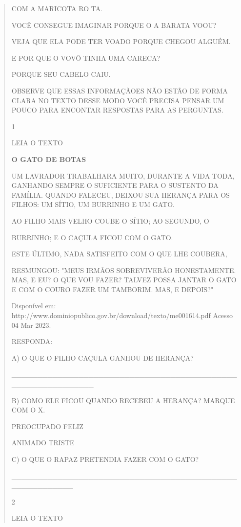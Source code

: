\begin{verse}
{COM A MARICOTA RO TA.

VOCÊ CONSEGUE IMAGINAR PORQUE O A BARATA VOOU?

VEJA QUE ELA PODE TER VOADO PORQUE CHEGOU ALGUÉM.

E POR QUE O VOVÔ TINHA UMA CARECA?

PORQUE SEU CABELO CAIU.

OBSERVE QUE ESSAS INFORMAÇÃOES NÃO ESTÃO DE FORMA CLARA NO TEXTO DESSE
MODO VOCÊ PRECISA PENSAR UM POUCO PARA ENCONTAR RESPOSTAS PARA AS
PERGUNTAS.


\num{1}

LEIA O TEXTO

\textbf{O GATO DE BOTAS}

UM LAVRADOR TRABALHARA MUITO, DURANTE A VIDA TODA, GANHANDO SEMPRE O
SUFICIENTE PARA O SUSTENTO DA FAMÍLIA. QUANDO FALECEU, DEIXOU SUA
HERANÇA PARA OS FILHOS: UM SÍTIO, UM BURRINHO E UM GATO.

AO FILHO MAIS VELHO COUBE O SÍTIO; AO SEGUNDO, O

BURRINHO; E O CAÇULA FICOU COM O GATO.

ESTE ÚLTIMO, NADA SATISFEITO COM O QUE LHE COUBERA,

RESMUNGOU: "MEUS IRMÃOS SOBREVIVERÃO HONESTAMENTE. MAS, E EU? O QUE VOU
FAZER? TALVEZ POSSA JANTAR O GATO E COM O COURO FAZER UM TAMBORIM. MAS,
E DEPOIS?"

Disponível em:
http://www.dominiopublico.gov.br/download/texto/me001614.pdf Acesso 04
Mar 2023.

RESPONDA:

A) O QUE O FILHO CAÇULA GANHOU DE HERANÇA?

\_\_\_\_\_\_\_\_\_\_\_\_\_\_\_\_\_\_\_\_\_\_\_\_\_\_\_\_\_\_\_\_\_\_\_\_\_\_\_\_\_\_\_\_\_\_\_\_\_\_\_\_\_\_\_\_\_\_\_\_


B) COMO ELE FICOU QUANDO RECEBEU A HERANÇA? MARQUE COM O X.

PREOCUPADO FELIZ

ANIMADO TRISTE

C) O QUE O RAPAZ PRETENDIA FAZER COM O GATO?

\_\_\_\_\_\_\_\_\_\_\_\_\_\_\_\_\_\_\_\_\_\_\_\_\_\_\_\_\_\_\_\_\_\_\_\_\_\_\_\_\_\_\_\_\_\_\_\_\_\_\_\_\_\_\_\_


\num{2}

LEIA O TEXTO

}
\end{verse}
